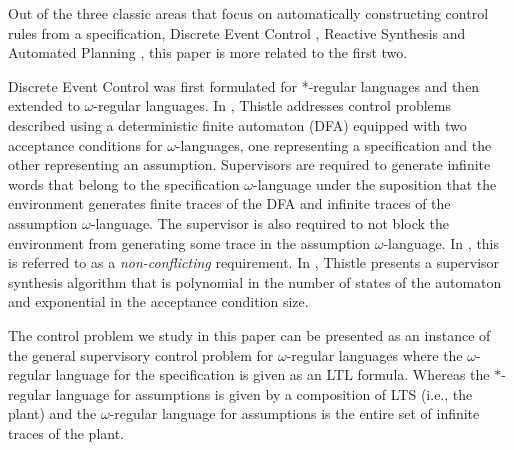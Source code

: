 Out of the three classic areas that focus on automatically constructing control rules from a specification,  Discrete Event Control \cite{ramadge_supervisory_1987}, Reactive Synthesis \cite{pnueli_synthesis} and Automated Planning \cite{nau2004automated}, this paper is more related to the first two.






Discrete Event Control was first formulated for *-regular languages \cite{ramadge_supervisory_1987} and then extended to $\omega$-regular languages. In \cite{thistle_control_1995}, Thistle addresses control problems described using a deterministic finite automaton (DFA) equipped with two acceptance conditions for $\omega$-languages, one representing a specification and the other representing an assumption. Supervisors 
are required to generate infinite words that belong to the specification $\omega$-language under the suposition that the environment generates finite traces of the DFA and infinite traces of the 
assumption $\omega$-language. The supervisor is also required to not block the environment from generating some trace in the assumption $\omega$-language.
In \cite{majumdar_supervisory_2021}, this is referred to as a \textit{non-conflicting} requirement. 
In \cite{thistle_control_1995}, Thistle presents a supervisor synthesis algorithm that is polynomial in the number of states of the automaton and exponential in the acceptance condition size.%

The control problem we study in this paper can be presented as an instance of the general supervisory control problem for $\omega$-regular languages where the $\omega$-regular language for the  specification is given as an LTL formula. Whereas the $*$-regular language for assumptions is given by a composition of LTS (i.e., the plant) and the $\omega$-regular language for assumptions is the entire set of infinite traces of the plant. 







